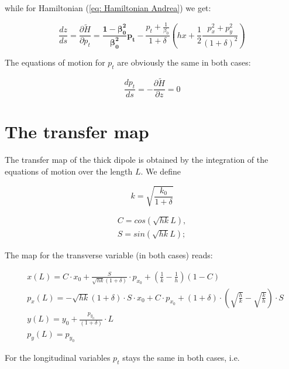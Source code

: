 \documentclass[12pt]{article}
\begin{document}
while for Hamiltonian (\ref{eq: Hamiltonian Andrea}) we get:


\begin{equation}
\label{eq: Motion Z Andrea}
\frac{dz}{ds} = \frac{\partial \tilde{H}}{\partial p_{t}} = \pmb{\frac{1-\beta_{0}^2}{\beta_{0}^2}p_{t}}- \frac{p_{t} + \frac{1}{\beta_{0}}}{1+\delta}\left(hx  + \frac{1}{2}\frac{p_{x}^{2}+ p_{y}^{2}}{(1+\delta)^{2}}\right)    
\end{equation}


The equations of motion for $p_{t}$ are obviously the same in both cases:

\begin{equation}
\label{eq: Motion PT}
\frac{dp_{t}}{ds} = -\frac{\partial \tilde{H}}{\partial z} = 0 
\end{equation}


\section{The transfer map}

The transfer map of the thick dipole is obtained by the integration of the equations of motion over the length $L$. 
We define 

\begin{equation}
\label{eq: strengh}
k = \sqrt{\frac{k_{0}}{1+\delta}}
\end{equation}

\begin{align}
C= cos (\sqrt{hk}L), \nonumber \\
S= sin (\sqrt{hk}L);\nonumber
\end{align}


The map for the transverse variable (in both cases) reads:

\begin{align}
& x(L) = C\cdot x_{0} + \frac{S}{\sqrt{hk}(1+\delta)}\cdot  p_{x_{0}} + \left(\frac{1}{k} - \frac{1}{h}\right)(1-C)\\
&p_{x}(L) =  -\sqrt{hk}(1+\delta)\cdot S\cdot x_{0} + C\cdot p_{x_{0}} + (1+\delta)\cdot \left(\sqrt{\frac{h}{k}} - \sqrt{\frac{k}{h}}\right)\cdot S \\
& y(L) =  y_{0} + \frac{ p_{y_{0}}}{(1+\delta)}\cdot L \\
&p_{y}(L)=  p_{y_{0}} 
\end{align}

For the longitudinal variables $p_{t}$ stays the same in both cases, i.e. 
\end{document}

